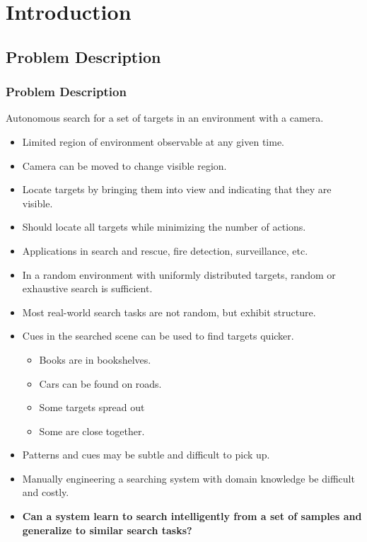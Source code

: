 
\section{Introduction}

\subsection{Problem Description}

\begin{frame}
    \frametitle{Problem Description}
    
    Autonomous search for a set of targets in an environment with a camera.
    
    \begin{itemize}
        \item Limited region of environment observable at any given time. 
        \item Camera can be moved to change visible region.
        \item Locate targets by bringing them into view and indicating that they are visible.
        \item Should locate all targets while minimizing the number of actions.
        \item Applications in search and rescue, fire detection, surveillance, etc.
    \end{itemize}
\end{frame}

\begin{frame}
    \begin{itemize}
        \item In a random environment with uniformly distributed targets, random or exhaustive search is sufficient.
        \item Most real-world search tasks are not random, but exhibit structure.
        \item Cues in the searched scene can be used to find targets quicker.
        \begin{itemize}
            \item Books are in bookshelves.
            \item Cars can be found on roads.
            \item Some targets spread out
            \item Some are close together.
        \end{itemize}
        \item Patterns and cues may be subtle and difficult to pick up.
        \item Manually engineering a searching system with domain knowledge be difficult and costly.
        \item \textbf{Can a system learn to search intelligently from a set of samples and generalize to similar search tasks?}
    \end{itemize}
\end{frame}

